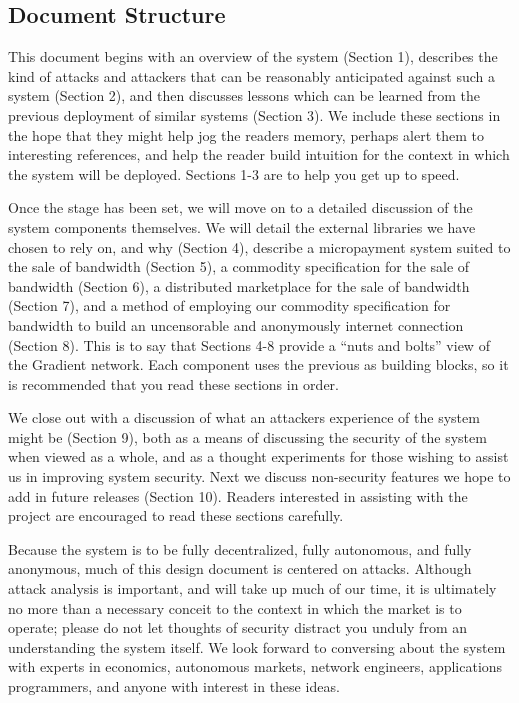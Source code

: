 \documentclass{article}
\begin{document}
\subsection{Document Structure}

This document begins with an overview of the system (Section 1), describes the kind of attacks and attackers that can be reasonably anticipated against such a system (Section 2), and then discusses lessons which can be learned from the previous deployment of similar systems (Section 3). We include these sections in the hope that they might help jog the readers memory, perhaps alert them to interesting references, and help the reader build intuition for the context in which the system will be deployed. Sections 1-3 are to help you get up to speed.

Once the stage has been set, we will move on to a detailed discussion of the system components themselves. We will detail the external libraries we have chosen to rely on, and why (Section 4), describe a micropayment system suited to the sale of bandwidth (Section 5), a commodity specification for the sale of bandwidth (Section 6), a distributed marketplace for the sale of bandwidth (Section 7), and a method of employing our commodity specification for bandwidth to build an uncensorable and anonymously internet connection (Section 8). This is to say that Sections 4-8 provide a “nuts and bolts” view of the Gradient network. Each component uses the previous as building blocks, so it is recommended that you read these sections in order.

We close out with a discussion of what an attackers experience of the system might be (Section 9), both as a means of discussing the security of the system when viewed as a whole, and as a thought experiments for those wishing to assist us in improving system security. Next we discuss non-security features we hope to add in future releases (Section 10). Readers interested in assisting with the project are encouraged to read these sections carefully.

Because the system is to be fully decentralized, fully autonomous, and fully anonymous, much of this design document is centered on attacks. Although attack analysis is important, and will take up much of our time, it is ultimately no more than a necessary conceit to the context in which the market is to operate; please do not let thoughts of security distract you unduly from an understanding the system itself. We look forward to conversing about the system with experts in economics, autonomous markets, network engineers, applications programmers, and anyone with interest in these ideas.
\end{document}

